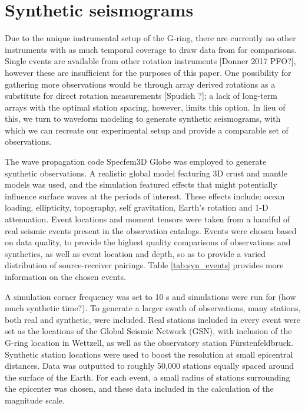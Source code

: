 \documentclass{gji}
\begin{document}
\section{Synthetic seismograms}
Due to the unique instrumental setup of the G-ring, there are currently no other instruments with as much temporal coverage to draw data from for comparisons. Single events are available from other rotation instruments [Donner 2017 PFO?], however these are insufficient for the purposes of this paper. One possibility for gathering more observations would be through array derived rotations as a substitute for direct rotation measurements [Spudich ?]; a lack of long-term arrays with the optimal station spacing, however, limits this option. In lieu of this, we turn to waveform modeling to generate synthetic seismograms, with which we can recreate our experimental setup and provide a comparable set of observations.

The wave propagation code Specfem3D Globe was employed to generate synthetic observations. A realistic global model featuring 3D crust and mantle models was used, and the simulation featured effects that might potentially influence surface waves at the periods of interest. These effects include: ocean loading, ellipticity, topography, self gravitation, Earth's rotation and 1-D attenuation. Event locations and moment tensors were taken from a handful of real seismic events present in the observation catalogs. Events were chosen based on data quality, to provide the highest quality comparisons of observations and synthetics, as well as event location and depth, so as to provide a varied distribution of source-receiver pairings. Table \ref{tab:syn_events} provides more information on the chosen events. 

A simulation corner frequency was set to 10 s and simulations were run for (how much synthetic time?). To generate a larger swath of observations, many stations, both real and synthetic, were included. Real stations included in every event were set as the locations of the Global Seismic Network (GSN), with inclusion of the G-ring location in Wettzell, as well as the observatory station F\"urstenfeldbruck. Synthetic station locations were used to boost the resolution at small epicentral distances. Data was outputted to roughly 50,000 stations equally spaced around the surface of the Earth. For each event, a small radius of stations surrounding the epicenter was chosen, and these data included in the calculation of the magnitude scale.
\end{document}
